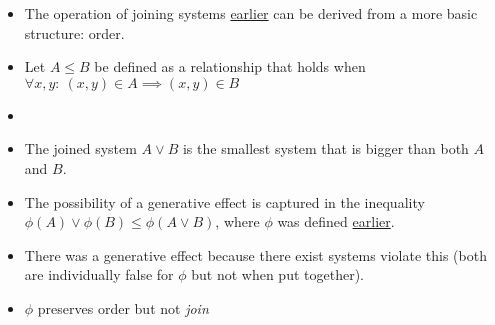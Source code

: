 \begin{itemize}
    \item The operation of joining systems \href{doc/1 math/Seven Sketches in Compositionality/1 Generative Effects/1 More than the sum of their parts/1 A first look at generative effects}{earlier} can be derived from a more basic structure: order.

    \item Let $A \leq B$ be defined as a relationship that holds when $\forall x,y:\ (x,y) \in A \implies (x,y) \in B$
    \item  {}
    \item  The joined system $A \lor B$ is the smallest system that is bigger than both $A$ and $B$.
    \item The possibility of a generative effect is captured in the inequality $\phi(A) \lor \phi(B) \leq \phi(A \lor B)$, where $\phi$ was defined \href{doc/1 math/Seven Sketches in Compositionality/1 Generative Effects/1 More than the sum of their parts/1 A first look at generative effects|reference}{earlier}.
    \item There was a generative effect because there exist systems violate this (both are individually false for $\phi$ but not when put together).
    \item $\phi$ preserves order but not \emph{join}
  \end{itemize}